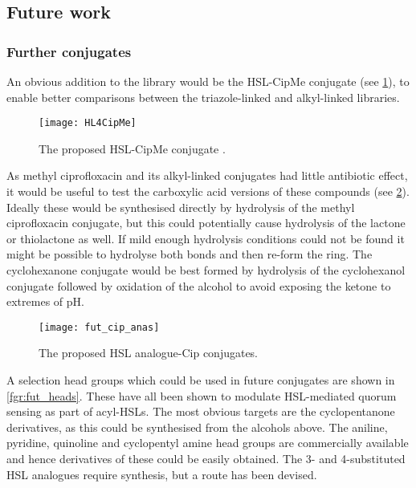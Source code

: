 \subsection{Future work \label{sec:Fut2}}

\subsubsection{Further conjugates}

An obvious addition to the library would be the HSL-CipMe conjugate (see \ref{fgr:HL4CipMe}), to enable better comparisons between the triazole-linked and alkyl-linked libraries.

\begin{figure}[H]
	\begin{center}
		\texttt{[image: HL4CipMe]}
		\caption{The proposed HSL-CipMe conjugate .
		\label{fgr:HL4CipMe}}
	\end{center}
\end{figure}

As methyl ciprofloxacin and its alkyl-linked conjugates had little antibiotic effect, it would be useful to test the carboxylic acid versions of these compounds (see \ref{fgr:fut_cip_anas}). Ideally these would be synthesised directly by hydrolysis of the methyl ciprofloxacin conjugate, but this could potentially cause hydrolysis of the lactone or thiolactone as well. If mild enough hydrolysis conditions could not be found it might be possible to hydrolyse both bonds and then re-form the ring\cite{Witiak1978}. The cyclohexanone conjugate would be best formed by hydrolysis of the cyclohexanol conjugate followed by oxidation of the alcohol to avoid exposing the ketone to extremes of pH.

\begin{figure}[H]
	\begin{center}
		\texttt{[image: fut\_cip\_anas]}
		\caption{The proposed HSL analogue-Cip conjugates.
		\label{fgr:fut_cip_anas}}
	\end{center}
\end{figure}

A selection head groups which could be used in future conjugates are shown in \ref{fgr:fut_heads}. These have all been shown to modulate HSL-mediated quorum sensing as part of acyl-HSLs\cite{Smith2003a,Welch2005,Ishida2007,Olsen2002,Smith2003,Hodgkinson2012a,Marsden2010}. The most obvious targets are the cyclopentanone derivatives, as this could be synthesised from the alcohols above. The aniline, pyridine, quinoline and cyclopentyl amine head groups are commercially available and hence derivatives of these could be easily obtained. The 3- and 4-substituted HSL analogues require synthesis, but a route has been devised\cite{Olsen2002}.

